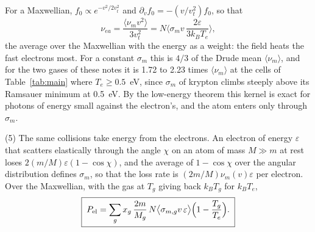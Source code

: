 \documentclass[11pt]{article}
\numberwithin{equation}{section}
\newcommand{\nuea}{\nu_{ea}}
\newcommand{\num}{\nu_m}
\newcommand{\vt}{v_t}
\newcommand{\kB}{k_B}
\newcommand{\Te}{T_e}
\begin{document}
For a Maxwellian, $f_0\propto e^{-v^2/2\vt^2}$ and $\partial_vf_0=-(v/\vt^2)f_0$, so that
\begin{equation}
\boxed{\;\nuea=\frac{\langle\num v^2\rangle}{3\vt^2}
=N\Big\langle\sigma_m v\,\frac{2\varepsilon}{3\kB\Te}\Big\rangle,\;}
\label{eq:nuea}
\end{equation}
the average over the Maxwellian with the energy as a weight: the field heats the fast
electrons most. For a constant $\sigma_m$ this is $4/3$ of the Drude mean
$\langle\num\rangle$, and for the two gases of these notes it is 1.72 to 2.23 times
$\langle\num\rangle$ at the cells of Table~\ref{tab:main} where $\Te\ge0.5$~eV, since
$\sigma_m$ of krypton climbs steeply above its Ramsauer minimum at 0.5~eV. By the low-energy theorem \cite{Low1958,KrollWatson1973} this kernel is exact
for photons of energy small against the electron's, and the atom enters only through
$\sigma_m$.

{\noindent}(5) The same collisions take energy from the electrons. An electron of
energy $\varepsilon$ that scatters elastically through the angle $\chi$ on an atom of mass
$M\gg m$ at rest loses $2(m/M)\varepsilon(1-\cos\chi)$, and the average of
$1-\cos\chi$ over the angular distribution defines $\sigma_m$, so that the loss rate is
$(2m/M)\num(v)\varepsilon$ per electron. Over the Maxwellian, with the gas at $T_g$
giving back $\kB T_g$ for $\kB\Te$,
\begin{equation}
\boxed{\;P_{\rm el}=\sum_gx_g\,\frac{2m}{M_g}\,N\big\langle\sigma_{m,g}v\,\varepsilon\big\rangle
\Big(1-\frac{T_g}{\Te}\Big).\;}
\label{eq:Pel}
\end{equation}
\end{document}
